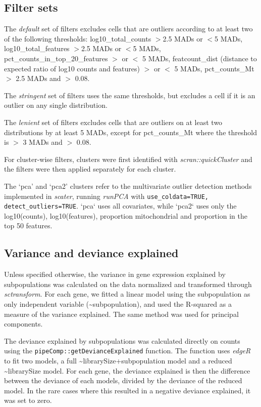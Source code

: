 \documentclass{bmcart}
\begin{document}
\subsection*{Filter sets}
The \textit{default} set of filters excludes cells that are outliers according to at least two of the following thresholds: log10\_total\_counts $>$2.5 MADs or $<$5 MADs, log10\_total\_features $>$2.5 MADs or $<$5 MADs, pct\_counts\_in\_top\_20\_features $>$ or $<$ 5 MADs, featcount\_dist (distance to expected ratio of log10 counts and features) $>$ or $<$ 5 MADs, pct\_counts\_Mt $>$ 2.5 MADs and $>$ 0.08.

The \textit{stringent} set of filters uses the same thresholds, but excludes a cell if it is an outlier on any single distribution. 

The \textit{lenient} set of filters excludes cells that are outliers on at least two distributions by at least 5 MADs, except for pct\_counts\_Mt where the threshold is $>$ 3 MADs and $>$ 0.08.

For cluster-wise filters, clusters were first identified with \textit{scran::quickCluster} and the filters were then applied separately for each cluster. 

The `pca' and `pca2' clusters refer to the multivariate outlier detection methods implemented in \textit{scater}, running \textit{runPCA} with \texttt{use\_coldata=TRUE, detect\_outliers=TRUE}. `pca` uses all covariates, while `pca2` uses only the log10(counts), log10(features), proportion mitochondrial and proportion in the top 50 features.

\subsection*{Variance and deviance explained}

Unless specified otherwise, the variance in gene expression explained by subpopulations was calculated on the data normalized and transformed through \textit{sctransform}. For each gene, we fitted a linear model using the subpopulation as only independent variable (\textasciitilde subpopulation), and used the R-squared as a measure of the variance explained. The same method was used for principal components.

The deviance explained by subpopulations was calculated directly on counts using the \texttt{pipeComp::getDevianceExplained} function. The function uses \textit{edgeR} to fit two models, a full \textasciitilde librarySize+subpopulation model and a reduced \textasciitilde librarySize model. For each gene, the deviance explained is then the difference between the deviance of each models, divided by the deviance of the reduced model. In the rare cases where this resulted in a negative deviance explained, it was set to zero.
\end{document}
